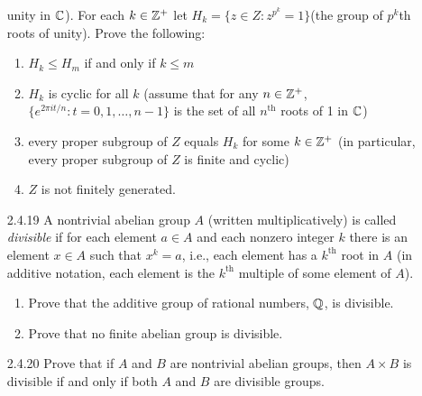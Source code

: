 \begin{enumerate}
                  unity in $\mathbb{C}$). For each $k \in \mathbb{Z}^+$ let
                  $H_k = \{z \in Z : z^{p^k} = 1\}$(the group of $p^k$th roots
                  of unity). Prove the following:
                  \begin{enumerate}
                     \item $H_k \le H_m$ if and only if $k \le m$
                     \item $H_k$ is cyclic for all $k$ (assume that for any
                           $n \in \mathbb{Z}^+$, $\{e^{2\pi it/n}:t =0,1,\ldots, n-1\}$
                           is the set of all $n^{\text{th}}$ roots of 1 in
                           $\mathbb{C}$)
                     \item every proper subgroup of $Z$ equals $H_k$ for some
                           $k \in \mathbb{Z}^+$ (in particular, every proper subgroup of
                           $Z$ is finite and cyclic)
                     \item $Z$ is not finitely generated.
                  \end{enumerate}
   \item[2.4.19]  A nontrivial abelian group $A$ (written multiplicatively) is
                  called \textit{divisible} if for each element $a \in A$ and
                  each nonzero integer $k$ there is an element $x \in A$ such
                  that $x^k = a$, i.e., each element has a $k^{\text{th}}$ root
                  in $A$ (in additive notation, each element is the
                  $k^{\text{th}}$ multiple of some element of $A$).
                  \begin{enumerate}
                     \item Prove that the additive group of rational numbers,
                           $\mathbb{Q}$, is divisible.
                     \item Prove that no finite abelian group is divisible.
                  \end{enumerate}
   \item[2.4.20]  Prove that if $A$ and $B$ are nontrivial abelian groups, then
                  $A \times B$ is divisible if and only if both $A$ and $B$ are
                  divisible groups.
\end{enumerate}

































